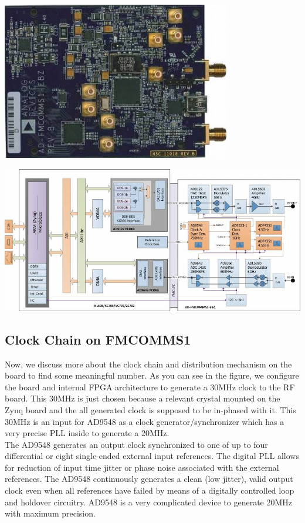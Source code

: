 \begin{center}
\includegraphics[width=10cm]{content/fig/fmcomms1.jpg}
\end{center}

\begin{center}
\includegraphics[width=15cm]{content/fig/fmcomms1Blockdiagram.jpg}
\end{center}

\subsection{Clock Chain on FMCOMMS1}
Now, we discuss more about the clock chain and distribution mechanism on the board to find some meaningful number. As you can see in the figure, we configure the board and internal FPGA architecture to generate a 30MHz clock to the RF board. This 30MHz is just chosen because a relevant crystal mounted on the Zynq board and the all generated clock is supposed to be in-phased with it. This 30MHz is an input for AD9548 as a clock generator/synchronizer which has a very precise PLL inside to generate a 20MHz.\\
The AD9548 generates an output clock synchronized to one of up to four differential or eight single-ended external input references. The digital PLL allows for reduction of input time jitter or phase noise associated with the external references. The AD9548 continuously generates a clean (low jitter), valid output clock even when all references have failed by means of a digitally controlled loop and holdover circuitry. AD9548 is a very complicated device to generate 20MHz with maximum precision.\\

